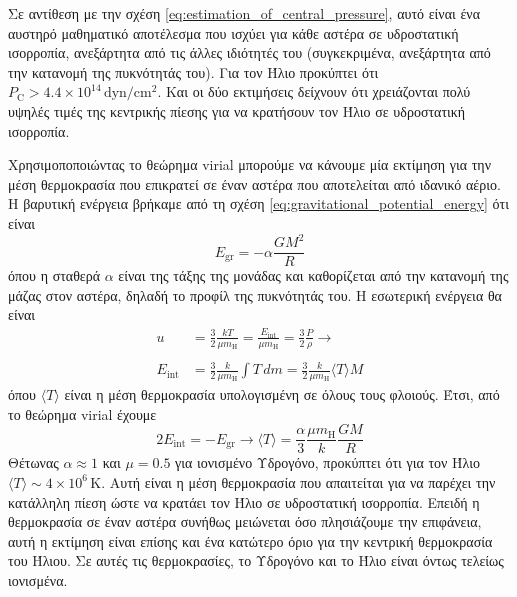        Σε αντίθεση με την σχέση \eqref{eq:estimation_of_central_pressure}, αυτό είναι ένα αυστηρό μαθηματικό αποτέλεσμα που ισχύει για κάθε αστέρα σε υδροστατική ισορροπία, ανεξάρτητα από τις άλλες ιδιότητές του (συγκεκριμένα, ανεξάρτητα από την κατανομή της πυκνότητάς του). Για τον Ήλιο προκύπτει ότι $P_{\text{C}} > 4.4 \times 10^{14} \,\text{dyn/cm$^2$}$. Και οι δύο εκτιμήσεις δείχνουν ότι χρειάζονται πολύ υψηλές τιμές της κεντρικής πίεσης για να κρατήσουν τον Ήλιο σε υδροστατική ισορροπία.
        
        
        Χρησιμοποποιώντας το θεώρημα virial μπορούμε να κάνουμε μία εκτίμηση για την μέση θερμοκρασία που επικρατεί σε έναν αστέρα που αποτελείται από ιδανικό αέριο. Η βαρυτική ενέργεια βρήκαμε από τη σχέση \eqref{eq:gravitational_potential_energy} ότι είναι
        \begin{equation*}
            E_{\text{gr}} = - \alpha \frac{GM^2}{R}
        \end{equation*}
        όπου η σταθερά $\alpha$ είναι της τάξης της μονάδας και καθορίζεται από την κατανομή της μάζας στον αστέρα, δηλαδή το προφίλ της πυκνότητάς του. Η εσωτερική ενέργεια θα είναι
        \begin{align*}
            u &= \frac{3}{2} \frac{kT}{\mu m_{\text{H}}} = \frac{E_{\text{int}}}{\mu m_{\text{H}}} = \frac{3}{2} \frac{P}{\rho}  \longrightarrow \\\\
            E_{\text{int}} &= \frac{3}{2} \frac{k}{\mu m_{\text{H}}} \int T \,dm = \frac{3}{2} \frac{k}{\mu m_{\text{H}}} \langle T \rangle M
        \end{align*}
        όπου $\langle T \rangle$ είναι η μέση θερμοκρασία υπολογισμένη σε όλους τους φλοιούς. Έτσι, από το θεώρημα virial έχουμε
        \begin{equation}
            2 E_{\text{int}} = - E_{\text{gr}} \longrightarrow \langle T \rangle = \frac{\alpha}{3} \frac{\mu m_{\text{H}}}{k} \frac{GM}{R}
        \end{equation}
        Θέτωνας $\alpha \approx 1$ και $\mu = 0.5$ για ιονισμένο Υδρογόνο, προκύπτει ότι για τον Ήλιο
        $\langle T \rangle \sim 4 \times 10^6 \,\text{K}$. Αυτή είναι η μέση θερμοκρασία που απαιτείται για να παρέχει την κατάλληλη πίεση ώστε να κρατάει τον Ήλιο σε υδροστατική ισορροπία. Επειδή η θερμοκρασία σε έναν αστέρα συνήθως μειώνεται όσο πλησιάζουμε την επιφάνεια, αυτή η εκτίμηση είναι επίσης και ένα κατώτερο όριο για την κεντρική θερμοκρασία του Ήλιου. Σε αυτές τις θερμοκρασίες, το Υδρογόνο και το Ήλιο είναι όντως τελείως ιονισμένα.
